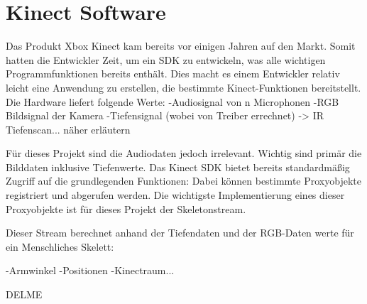 \section{Kinect Software}\label{Software}
Das Produkt Xbox Kinect kam bereits vor einigen Jahren auf den Markt. Somit hatten die Entwickler Zeit, um ein SDK zu entwickeln, was alle wichtigen Programmfunktionen bereits enthält. Dies macht es einem Entwickler relativ leicht eine Anwendung zu erstellen, die bestimmte Kinect-Funktionen bereitstellt. 
Die Hardware liefert folgende Werte:
-Audiosignal von n Microphonen
-RGB Bildsignal der Kamera
-Tiefensignal (wobei von Treiber errechnet) -> IR Tiefenscan... näher erläutern

Für dieses Projekt sind die Audiodaten jedoch irrelevant. Wichtig sind primär die Bilddaten inklusive Tiefenwerte.
Das Kinect SDK bietet bereits standardmäßig Zugriff auf die grundlegenden Funktionen:
Dabei können bestimmte Proxyobjekte registriert und abgerufen werden. Die wichtigste Implementierung eines dieser Proxyobjekte ist für dieses Projekt der Skeletonstream.

Dieser Stream berechnet anhand der Tiefendaten und der RGB-Daten werte für ein Menschliches Skelett:

-Armwinkel
-Positionen
-Kinectraum...




DELME\cite{hertzberg2009mobile}

